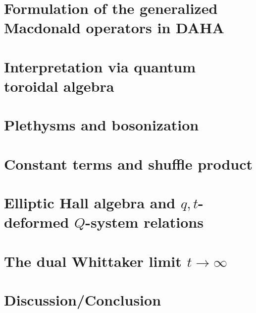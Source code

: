 \documentclass[12pt]{amsart}
\begin{document}
\section{Formulation of the generalized Macdonald operators in DAHA}\label{dahasec}



\section{Interpretation via quantum toroidal algebra}\label{qtorsec}


\section{Plethysms and bosonization}\label{bososec}


\section{Constant terms and shuffle product}\label{shufflesec}


%
\section{Elliptic Hall algebra and $q,t$-deformed $Q$-system relations}\label{EHAsec}


\section{The dual Whittaker limit $t\to\infty$}\label{whitaklimsec}


\section{Discussion/Conclusion}\label{concsec}







\end{document}
